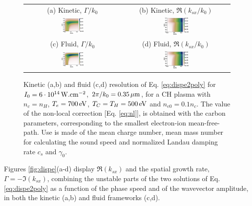 \documentclass[
 reprint,
 superscriptaddress,
 amsmath,amssymb,
 aps,
]{revtex4-1}
\begin{document}
\begin{figure}
\begin{tabular}{cc}
(a) Kinetic, $\Gamma/k_0$ &
(b)  Kinetic, $\Re(k_{sx}/k_0)$ \\
\includegraphics[width=0.24\textwidth]{Fig2a.eps}&
\includegraphics[width=0.24\textwidth]{Fig2b.eps}\\
(c) Fluid, $\Gamma/k_0$  &
(d) Fluid, $\Re(k_{sx}/k_0)$  \\
\includegraphics[width=0.24\textwidth]{Fig2c.eps}&
\includegraphics[width=0.24\textwidth]{Fig2d.eps}
\end{tabular}
\caption{ \label{fig:dispeCH}  
Kinetic (a,b) and fluid (c,d) resolution of Eq. \eqref{eq:dispe2poly} for  $I_0 = 6\cdot 10^{14}\, \rm W.cm^{-2}$, $2\pi/k_0=0.35 \,\rm\mu m$, for a CH plasma with $n_c=n_H$, $T_e =700\,\rm  eV$, $T_C=T_H =500\,  \rm eV$ and $n_{e0}=0.1n_c$. The value of the non-local correction [Eq. \eqref{eq:nl}], is obtained with the carbon parameters, corresponding to the smallest electron-ion mean-free-path. Use is made of the mean charge number, mean mass number   for calculating the sound speed and normalized Landau damping rate $c_s$ and $\gamma_0$.
 }
\end{figure}
Figures \ref{fig:dispe}(a-d) display  $\Re(k_{sx})$ and the spatial growth rate,  $\Gamma=-\Im(k_{sx})$, combining   the  unstable parts of the two  solutions of Eq. \eqref{eq:dispe2poly} as a function of the phase speed and of the wavevector amplitude, in both the kinetic (a,b) and fluid frameworks (c,d).
\end{document}
